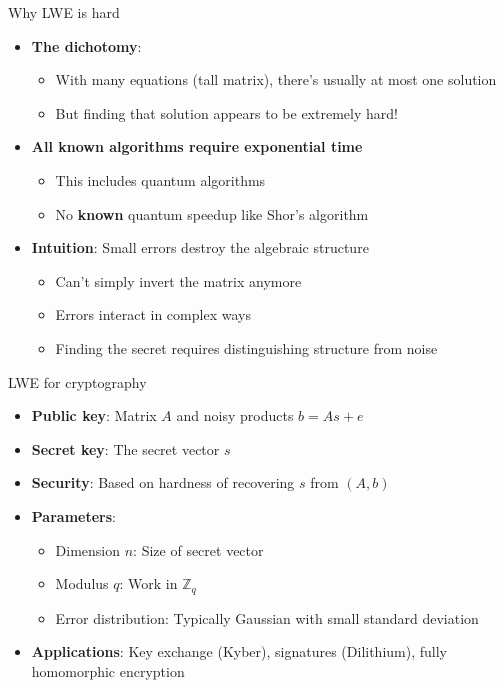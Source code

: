\documentclass[aspectratio=169, lualatex, handout]{beamer}
\begin{document}
\begin{frame}{Why LWE is hard}
	\begin{itemize}
		\item \textbf{The dichotomy}:
		      \begin{itemize}
			      \item With many equations (tall matrix), there's usually at most one solution
			      \item But finding that solution appears to be extremely hard!
		      \end{itemize}
		\item \textbf{All known algorithms require exponential time}
		      \begin{itemize}
			      \item This includes quantum algorithms
			      \item No \textbf{known} quantum speedup like Shor's algorithm
		      \end{itemize}
		\item \textbf{Intuition}: Small errors destroy the algebraic structure
		      \begin{itemize}
			      \item Can't simply invert the matrix anymore
			      \item Errors interact in complex ways
			      \item Finding the secret requires distinguishing structure from noise
		      \end{itemize}
	\end{itemize}
\end{frame}

\begin{frame}{LWE for cryptography}
	\begin{itemize}
		\item \textbf{Public key}: Matrix $A$ and noisy products $b = As + e$
		\item \textbf{Secret key}: The secret vector $s$
		\item \textbf{Security}: Based on hardness of recovering $s$ from $(A, b)$
		\item \textbf{Parameters}:
		      \begin{itemize}
			      \item Dimension $n$: Size of secret vector
			      \item Modulus $q$: Work in $\mathbb{Z}_q$
			      \item Error distribution: Typically Gaussian with small standard deviation
		      \end{itemize}
		\item \textbf{Applications}: Key exchange (Kyber), signatures (Dilithium), fully homomorphic encryption
	\end{itemize}
\end{frame}
\end{document}
